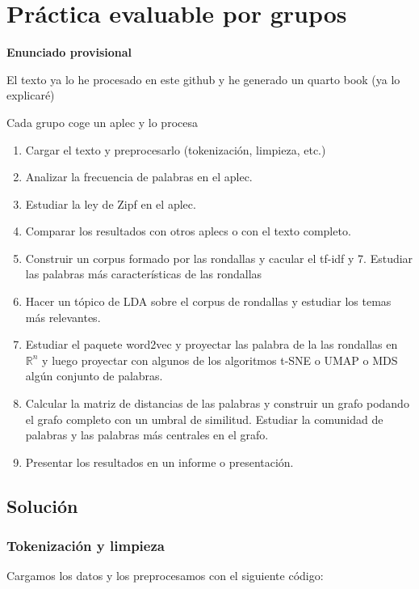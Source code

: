 \documentclass[
  letterpaper,
  DIV=11,
  numbers=noendperiod]{scrreprt}
\providecommand{\tightlist}{%
  \setlength{\itemsep}{0pt}\setlength{\parskip}{0pt}}
\begin{document}
\chapter{Práctica evaluable por
grupos}\label{pruxe1ctica-evaluable-por-grupos}

\textbf{Enunciado provisional}

El texto ya lo he procesado en este github y he generado un quarto book
(ya lo explicaré)

Cada grupo coge un aplec y lo procesa

\begin{enumerate}
\def\labelenumi{\arabic{enumi}.}
\tightlist
\item
  Cargar el texto y preprocesarlo (tokenización, limpieza, etc.)
\item
  Analizar la frecuencia de palabras en el aplec.
\item
  Estudiar la ley de Zipf en el aplec.
\item
  Comparar los resultados con otros aplecs o con el texto completo.
\item
  Construir un corpus formado por las rondallas y cacular el tf-idf y 7.
  Estudiar las palabras más características de las rondallas
\item
  Hacer un tópico de LDA sobre el corpus de rondallas y estudiar los
  temas más relevantes.
\item
  Estudiar el paquete word2vec y proyectar las palabra de la las
  rondallas en \(\mathbb{R}^n\) y luego proyectar con algunos de los
  algoritmos t-SNE o UMAP o MDS algún conjunto de palabras.
\item
  Calcular la matriz de distancias de las palabras y construir un grafo
  podando el grafo completo con un umbral de similitud. Estudiar la
  comunidad de palabras y las palabras más centrales en el grafo.
\item
  Presentar los resultados en un informe o presentación.
\end{enumerate}

\section{Solución}\label{soluciuxf3n}

\subsection{Tokenización y limpieza}\label{tokenizaciuxf3n-y-limpieza}

Cargamos los datos y los preprocesamos con el siguiente código:
\end{document}
